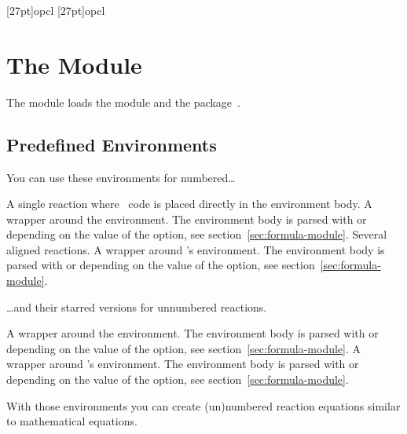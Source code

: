 \documentclass{chemmacros-manual}
\begin{document}
\begin{example}
  \makepolymerdelims{5pt}[27pt]{op}{cl}
  \makepolymerdelims[delimiters=()]{5pt}[27pt]{op}{cl}
\end{example}

\section{The  Module}\label{sec:reactions-module}
The  module loads the  module
and the  package~\cite{pkg:mathtools}.

\subsection{Predefined Environments}

You can use these environments for numbered\ldots
\begin{environments}
    A single reaction where \chemformula\ code is placed directly in the
    environment body.  A wrapper around the  environment.  The
    environment body is parsed with  or  depending on the value
    of the  option, see
    section~\vref{sec:formula-module}.
    Several aligned reactions.  A wrapper around 's 
    environment.  The environment body is parsed with  or 
    depending on the value of the  option, see
    section~\vref{sec:formula-module}.
\end{environments}

\ldots and their starred versions for unnumbered reactions.
\begin{environments}
    A wrapper around the  environment.  The environment body
    is parsed with  or  depending on the value of the
     option, see section~\vref{sec:formula-module}.
    A wrapper around 's  environment.  The
    environment body is parsed with  or  depending on the value
    of the  option, see
    section~\vref{sec:formula-module}.
\end{environments}

With those environments you can create (un)numbered reaction equations similar
to mathematical equations.
\end{document}
